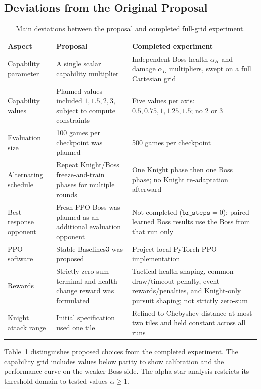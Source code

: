 \documentclass{article}
\begin{document}
\subsection{Deviations from the Original Proposal}
\label{sec:deviations}
\begin{table}[t]
\centering
\caption{Main deviations between the proposal and completed full-grid experiment.}
\label{tab:deviations}
\small
\begin{tabularx}{\textwidth}{@{}p{}p{}X@{}}
\toprule
Aspect & Proposal & Completed experiment \\
\midrule
Capability parameter & A single scalar capability multiplier & Independent Boss health $\alpha_H$ and damage $\alpha_D$ multipliers, swept on a full Cartesian grid \\
Capability values & Planned values included $1,1.5,2,3$, subject to compute constraints & Five values per axis: $0.5,0.75,1,1.25,1.5$; no $2$ or $3$ \\
Evaluation size & 100 games per checkpoint was planned & 500 games per checkpoint \\
Alternating schedule & Repeat Knight/Boss freeze-and-train phases for multiple rounds & One Knight phase then one Boss phase; no Knight re-adaptation afterward \\
Best-response opponent & Fresh PPO Boss was planned as an additional evaluation opponent & Not completed ($\texttt{br\_steps}=0$); paired learned Boss results use the Boss from that run only \\
PPO software & Stable-Baselines3 was proposed \cite{raffin2021stable} & Project-local PyTorch PPO implementation \\
Rewards & Strictly zero-sum terminal and health-change reward was formulated & Tactical health shaping, common draw/timeout penalty, event rewards/penalties, and Knight-only pursuit shaping; not strictly zero-sum \\
Knight attack range & Initial specification used one tile & Refined to Chebyshev distance at most two tiles and held constant across all runs \\
\bottomrule
\end{tabularx}
\end{table}

Table~\ref{tab:deviations} distinguishes proposed choices from the completed experiment.
The capability grid includes values below parity to show calibration and the performance curve on the weaker-Boss side. The alpha-star analysis restricts its threshold domain to tested values $\alpha\ge1$.
\end{document}
